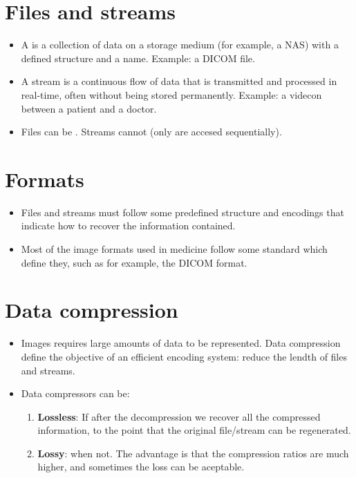\section{Files and streams}
\begin{itemize}
\item A  is a collection of data  on a storage
medium (for example, a NAS) with a defined structure and a
name. Example: a DICOM file.
\item A stream is a continuous flow of data that is transmitted and
processed in real-time, often without being stored
permanently. Example: a videcon between a patient and a doctor.
\item Files can be . Streams cannot (only are accesed
sequentially).
\end{itemize}

\section{Formats}
\begin{itemize}
\item Files and streams must follow some predefined structure and
encodings that indicate how to recover the information contained.
\item Most of the image formats used in medicine follow some standard
which define they, such as for example, the DICOM format.
\end{itemize}

\section{Data compression}
\begin{itemize}
\item Images requires large amounts of data to be represented. Data
compression define the objective of an efficient encoding system:
reduce the lendth of files and streams.
\item Data compressors can be:
\begin{enumerate}
\item \textbf{Lossless}: If after the decompression we recover all the
compressed information, to the point that the original file/stream can
be regenerated.
\item \textbf{Lossy}: when not. The advantage is that the compression
ratios are much higher, and sometimes the loss can be aceptable.
\end{enumerate}
\end{itemize}


